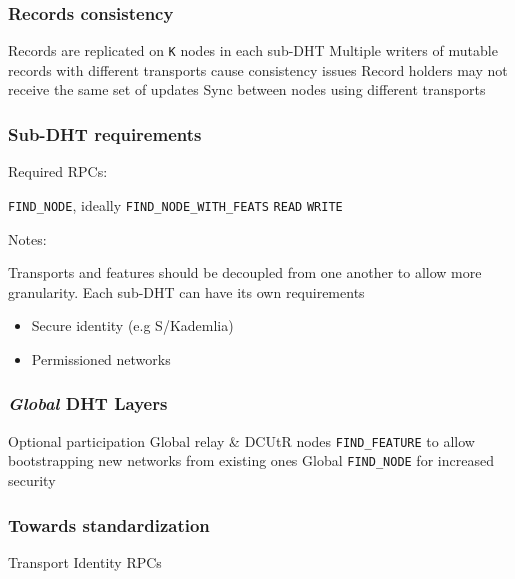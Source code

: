 \documentclass{../shipyard-slide}
\begin{document}
\begin{frame}
\frametitle{Records consistency}

\begin{enumerate}
	\itemc Records are replicated on \texttt{K} nodes in each sub-DHT
	\itemc Multiple writers of mutable records with different transports cause consistency issues
	\itemc Record holders may not receive the same set of updates
	\itemc Sync between nodes using different transports
\end{enumerate}
\end{frame}


\begin{frame}
\frametitle{Sub-DHT requirements}

Required RPCs:
\begin{itemize}
	\itemc \texttt{FIND\_NODE}, ideally \texttt{FIND\_NODE\_WITH\_FEATS}
	\itemc \texttt{READ}
	\itemc \texttt{WRITE}
\end{itemize}

\medskip

Notes:
\begin{itemize}
	\itemc Transports and features should be decoupled from one another to allow more granularity.
	\itemc Each sub-DHT can have its own requirements
	\begin{itemize}
		\item[\greencube] Secure identity (e.g S/Kademlia)
		\item[\greencube] Permissioned networks
	\end{itemize}
\end{itemize}

\end{frame}

\begin{frame}
\frametitle{\textit{Global} DHT Layers}

\begin{itemize}
	\itemc Optional participation
	\itemc Global relay \& DCUtR nodes
	\itemc \texttt{FIND\_FEATURE} to allow bootstrapping new networks from existing ones
	\itemc Global \texttt{FIND\_NODE} for increased security
\end{itemize}
\end{frame}



\begin{frame}
\frametitle{Towards standardization}

\begin{itemize}
	\itemc Transport
	\itemc Identity
	\itemc RPCs
\end{itemize}

\end{frame}
\end{document}
